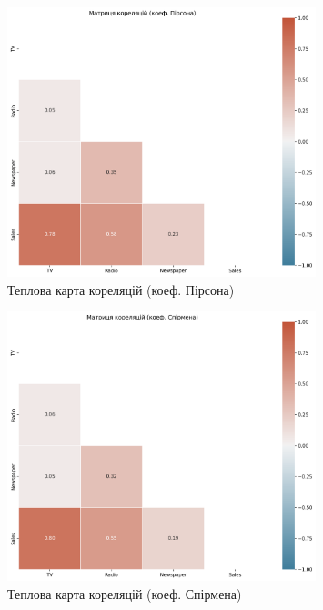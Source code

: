 \documentclass{article}
\begin{document}
    \vspace{0.5cm}
    
    \begin{figure}[H]
       \centering
       \includegraphics[width=0.8\textwidth]{correlation_heatmap.png}
       \caption{Теплова карта кореляцій (коеф. Пірсона)}
       \label{fig:теплова_карта_кореляцій_(коеф._пірсона)}
    \end{figure}

    \vspace{0.5cm}
    
    \begin{figure}[H]
       \centering
       \includegraphics[width=0.8\textwidth]{correlation_heatmap_spearman.png}
       \caption{Теплова карта кореляцій (коеф. Спірмена)}
       \label{fig:теплова_карта_кореляцій_(коеф._спірмена)}
    \end{figure}
\end{document}
